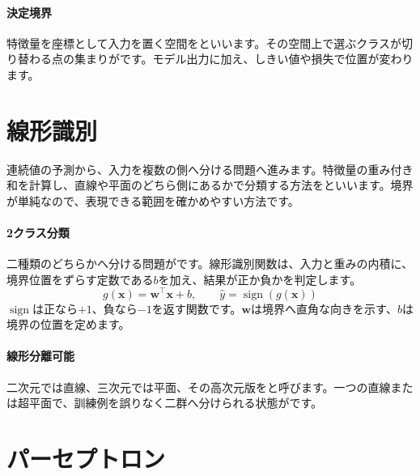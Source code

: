 \paragraph{決定境界}
        特徴量を座標として入力を置く空間をといいます。その空間上で選ぶクラスが切り替わる点の集まりがです。モデル出力に加え、しきい値や損失で位置が変わります。

\par
\endgroup
\par
\endgroup


\section{線形識別}
\label{sec:06-machine-learning-14}

連続値の予測から、入力を複数の側へ分ける問題へ進みます。特徴量の重み付き和を計算し、直線や平面のどちら側にあるかで分類する方法をといいます。境界が単純なので、表現できる範囲を確かめやすい方法です。

\begingroup
\begingroup
      \centering
\par
\endgroup
\medskip
\begingroup
\paragraph{2クラス分類}
        二種類のどちらかへ分ける問題がです。線形識別関数は、入力と重みの内積に、境界位置をずらす定数である$b$を加え、結果が正か負かを判定します。
        \[
          g(\mathbf{x})=\mathbf{w}^\top\mathbf{x}+b,\qquad
          \hat{y}=\operatorname{sign}(g(\mathbf{x}))
        \]
        $\operatorname{sign}$は正なら$+1$、負なら$-1$を返す関数です。$\mathbf{w}$は境界へ直角な向きを示す、$b$は境界の位置を定めます。

\paragraph{線形分離可能}
        二次元では直線、三次元では平面、その高次元版をと呼びます。一つの直線または超平面で、訓練例を誤りなく二群へ分けられる状態がです。

\par
\endgroup
\par
\endgroup


\section{パーセプトロン}
\label{sec:06-machine-learning-15}

